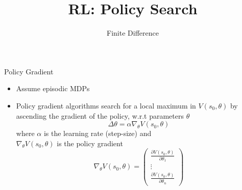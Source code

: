 \documentclass[aspectratio=169]{../latex_main/tntbeamer}  %
\title[RL: Finite Difference]{RL: Policy Search}
\subtitle{Finite Difference}
\begin{document}
	
	\maketitle

\begin{frame}[c]{Policy Gradient}

\begin{itemize}
	\item Assume episodic MDPs 
	\item Policy gradient algorithms search for a \alert{local} maximum in $V(s_0,\theta)$ by ascending the gradient of the policy, w.r.t parameters $\theta$
	$$\Delta \theta = \alpha \nabla_\theta V(s_0, \theta) $$
	where $\alpha$ is the learning rate (step-size) and\\ $\nabla_\theta V(s_0, \theta)$ is the policy gradient
	$$\nabla_\theta V(s_0, \theta) = \begin{pmatrix}
	\frac{\partial V(s_0, \theta)}{\partial \theta_1}\\
	\vdots\\
	\frac{\partial V(s_0, \theta)}{\partial \theta_n}
	\end{pmatrix} $$
	
\end{itemize}

\end{frame}
\end{document}
